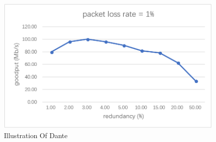 \begin{figure}[ht]
	\centering
	\includegraphics[scale=0.25]{paper_figs/tradeoff_only_goodput.png}
	\caption{Illustration Of Dante}
	\label{paper_figs:pathdemo}
\end{figure}

